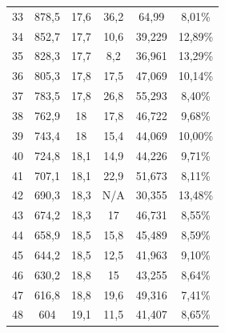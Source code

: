 \begin{longtable}[H]{cccccc}
  33          & 878,5                & 17,6          & 36,2           & 64,99         & 8,01\%                               \\
  34          & 852,7                & 17,7          & 10,6           & 39,229        & 12,89\%                              \\
  35          & 828,3                & 17,7          & 8,2            & 36,961        & 13,29\%                              \\
  36          & 805,3                & 17,8          & 17,5           & 47,069        & 10,14\%                              \\
  37          & 783,5                & 17,8          & 26,8           & 55,293        & 8,40\%                               \\
  38          & 762,9                & 18            & 17,8           & 46,722        & 9,68\%                               \\
  39          & 743,4                & 18            & 15,4           & 44,069        & 10,00\%                              \\
  40          & 724,8                & 18,1          & 14,9           & 44,226        & 9,71\%                               \\
  41          & 707,1                & 18,1          & 22,9           & 51,673        & 8,11\%                               \\
  42          & 690,3                & 18,3          & N/A            & 30,355        & 13,48\%                              \\
  43          & 674,2                & 18,3          & 17             & 46,731        & 8,55\%                               \\
  44          & 658,9                & 18,5          & 15,8           & 45,489        & 8,59\%                               \\
  45          & 644,2                & 18,5          & 12,5           & 41,963        & 9,10\%                               \\
  46          & 630,2                & 18,8          & 15             & 43,255        & 8,64\%                               \\
  47          & 616,8                & 18,8          & 19,6           & 49,316        & 7,41\%                               \\
  48          & 604                  & 19,1          & 11,5           & 41,407        & 8,65\%                               \\

\end{longtable}
